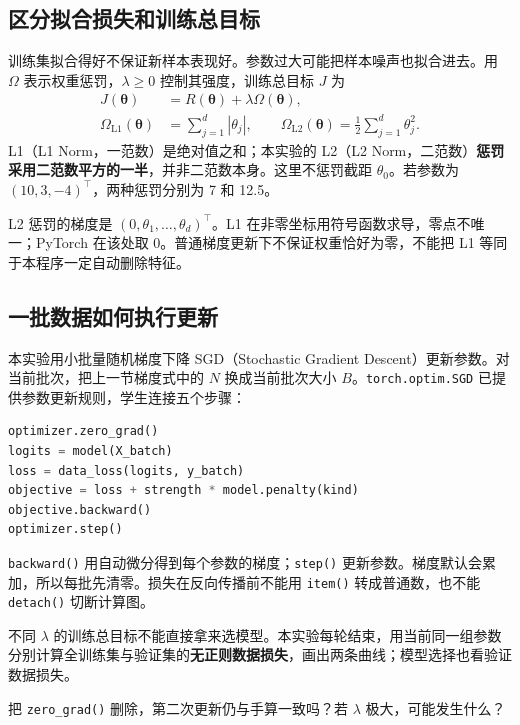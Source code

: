 \documentclass[UTF8,a4paper,11pt,fontset=fandol]{ctexart}
\begin{document}
\subsection{区分拟合损失和训练总目标}
训练集拟合得好不保证新样本表现好。参数过大可能把样本噪声也拟合进去。用 $\Omega$ 表示权重惩罚，$\lambda\ge0$ 控制其强度，训练总目标 $J$ 为
\begin{equation}
\begin{aligned}
J(\boldsymbol\theta)&=R(\boldsymbol\theta)+\lambda\Omega(\boldsymbol\theta),\\
\Omega_{\mathrm{L1}}(\boldsymbol\theta)&=\sum_{j=1}^d|\theta_j|,\qquad
\Omega_{\mathrm{L2}}(\boldsymbol\theta)=\frac12\sum_{j=1}^d\theta_j^2.
\end{aligned}
\end{equation}
L1（L1 Norm，一范数）是绝对值之和；本实验的 L2（L2 Norm，二范数）\textbf{惩罚采用二范数平方的一半}，并非二范数本身。这里不惩罚截距 $\theta_0$。若参数为 $(10,3,-4)^\top$，两种惩罚分别为 7 和 12.5。

L2 惩罚的梯度是 $(0,\theta_1,\ldots,\theta_d)^\top$。L1 在非零坐标用符号函数求导，零点不唯一；PyTorch 在该处取 0。普通梯度更新下不保证权重恰好为零，不能把 L1 等同于本程序一定自动删除特征。
\subsection{一批数据如何执行更新}
本实验用小批量随机梯度下降 SGD（Stochastic Gradient Descent）更新参数。对当前批次，把上一节梯度式中的 $N$ 换成当前批次大小 $B$。\texttt{torch.optim.SGD} 已提供参数更新规则，学生连接五个步骤：
\begin{lstlisting}[language=Python]
optimizer.zero_grad()
logits = model(X_batch)
loss = data_loss(logits, y_batch)
objective = loss + strength * model.penalty(kind)
objective.backward()
optimizer.step()
\end{lstlisting}
\texttt{backward()} 用自动微分得到每个参数的梯度；\texttt{step()} 更新参数。梯度默认会累加，所以每批先清零。损失在反向传播前不能用 \texttt{item()} 转成普通数，也不能 \texttt{detach()} 切断计算图。
\begin{pitfallbox}[曲线必须比较同一种量]
不同 $\lambda$ 的训练总目标不能直接拿来选模型。本实验每轮结束，用当前同一组参数分别计算全训练集与验证集的\textbf{无正则数据损失}，画出两条曲线；模型选择也看验证数据损失。
\end{pitfallbox}
\begin{questionbox}[检查点 C5/C6]
把 \texttt{zero\_grad()} 删除，第二次更新仍与手算一致吗？若 $\lambda$ 极大，可能发生什么？
\end{questionbox}
\clearpage
\end{document}
